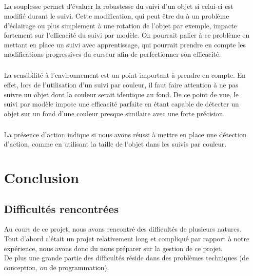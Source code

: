 \documentclass{report}
\begin{document}
			\paragraph{}
			La souplesse permet d'évaluer la robustesse du suivi d'un objet si celui-ci est modifié durant le suivi. Cette modification, qui peut être du à un problème d'éclairage ou plus simplement à une rotation de l'objet par exemple, impacte fortement sur l'efficacité du suivi par modèle. On pourrait palier à ce problème en mettant en place un suivi avec apprentissage, qui pourrait prendre en compte les modifications progressives du curseur afin de perfectionner son efficacité.
			\paragraph{}
			La sensibilité à l'environnement est un point important à prendre en compte. En effet, lors de l'utilisation d'un suivi par couleur, il faut faire attention à ne pas suivre un objet dont la couleur serait identique au fond. De ce point de vue, le suivi par modèle impose une efficacité parfaite en étant capable de détecter un objet sur un fond d'une couleur presque similaire avec une forte précision.
			\paragraph{}
			La présence d'action indique si nous avons réussi à mettre en place une détection d'action, comme en utilisant la taille de l'objet dans les suivis par couleur.
	\chapter{Conclusion}
		\section{Difficultés rencontrées}
		Au cours de ce projet, nous avons rencontré des difficultés de plusieurs natures. Tout d'abord c'était un projet relativement long et compliqué par rapport à notre expérience, nous avons donc du nous préparer sur la gestion de ce projet. \\
		De plus une grande partie des difficultés réside dans des problèmes techniques (de conception, ou de programmation). \\
		
\end{document}
